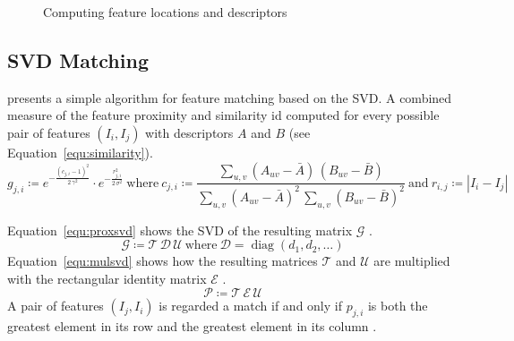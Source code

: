 \documentclass[12pt,a4paper,oneside,openright]{book}
\newcommand{\equ}[1]{Equation~\ref{equ:#1}}
\newcommand{\farr}{\ding{231}} %
\begin{document}
\begin{CJK}{UTF8}{}
\begin{figure}[htbp]
\begin{center}
\begin{minipage}[c]{.213\textwidth}
    \end{minipage}
    {\huge \farr}
    \begin{minipage}[c]{.213\textwidth}
    \end{minipage}
    \caption{Computing feature locations and descriptors\label{fig:descr}}
  \end{center}
\end{figure}

\subsection{\acs{SVD} Matching}
\citet{RefWorks:577} presents a simple algorithm for feature matching based on the \ac{SVD}. A combined measure of the feature proximity and similarity id computed for every possible pair of features $(I_i,I_j)$ with descriptors $A$ and $B$ (see \equ{similarity}).
\begin{equation}\label{equ:similarity}
  g_{j,i}\coloneqq e^{-\frac{(c_{j,i}-1)^2}{2\,\gamma^2}}\cdot e^{-\frac{r^2_{j,i}}{2\,\sigma^2}}\mathrm{\ where\ }c_{j,i}\coloneqq\frac{\sum_{u,v}(A_{uv}-\bar{A})\,(B_{uv}-\bar{B})}{\sum_{u,v}(A_{uv}-\bar{A})^2\,\sum_{u,v}(B_{uv}-\bar{B})^2}\mathrm{\ and\ }r_{i,j}\coloneqq\left|I_i-I_j\right|
\end{equation}

\equ{proxsvd} shows the \ac{SVD} of the resulting matrix $\mathcal{G}$ \citep{RefWorks:577}.
\begin{equation}\label{equ:proxsvd}
  \mathcal{G}\coloneqq\mathcal{T}\,\mathcal{D}\,\mathcal{U}\mathrm{\ where\ }\mathcal{D}=\operatorname{diag}(d_1,d_2,\ldots)
\end{equation}
\equ{mulsvd} shows how the resulting matrices $\mathcal{T}$ and $\mathcal{U}$ are multiplied with the rectangular identity matrix $\mathcal{E}$ \citep{RefWorks:577}.
\begin{equation}\label{equ:mulsvd}
  \mathcal{P}\coloneqq\mathcal{T}\,\mathcal{E}\,\mathcal{U}
\end{equation}
A pair of features $(I_j,I_i)$ is regarded a match if and only if $p_{j,i}$ is both the greatest element in its row and the greatest element in its column \citep{RefWorks:577}.


\end{CJK}
\end{document}
